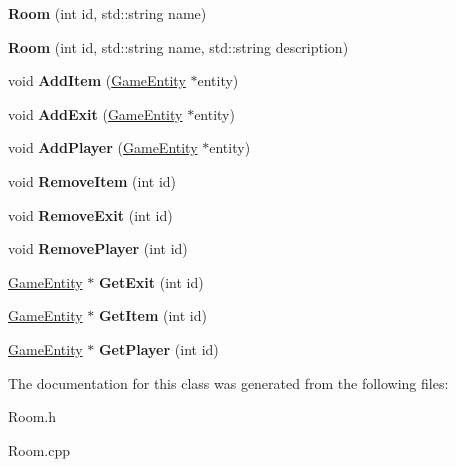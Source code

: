 \begin{DoxyCompactItemize}
\item 
\hypertarget{class_room_a18d9c7ed056c4bec868cf6939dc90aac}{}{\bfseries Room} (int id, std\+::string name)\label{class_room_a18d9c7ed056c4bec868cf6939dc90aac}

\item 
\hypertarget{class_room_a2286569deae9af3cafc5716ce72dcbf1}{}{\bfseries Room} (int id, std\+::string name, std\+::string description)\label{class_room_a2286569deae9af3cafc5716ce72dcbf1}

\item 
\hypertarget{class_room_a174291564fa1e50053230b844c9dc401}{}void {\bfseries Add\+Item} (\hyperlink{class_game_entity}{Game\+Entity} $\ast$entity)\label{class_room_a174291564fa1e50053230b844c9dc401}

\item 
\hypertarget{class_room_a9d3ded2524dc65d34bcdac48ebfbca4f}{}void {\bfseries Add\+Exit} (\hyperlink{class_game_entity}{Game\+Entity} $\ast$entity)\label{class_room_a9d3ded2524dc65d34bcdac48ebfbca4f}

\item 
\hypertarget{class_room_acc80f8dea695a3eee94607fa83531c8c}{}void {\bfseries Add\+Player} (\hyperlink{class_game_entity}{Game\+Entity} $\ast$entity)\label{class_room_acc80f8dea695a3eee94607fa83531c8c}

\item 
\hypertarget{class_room_a2911ca54dcdcde1e2d483d039e01cc62}{}void {\bfseries Remove\+Item} (int id)\label{class_room_a2911ca54dcdcde1e2d483d039e01cc62}

\item 
\hypertarget{class_room_a18fe6c4958fe671bcb417bc8fa5b2f3a}{}void {\bfseries Remove\+Exit} (int id)\label{class_room_a18fe6c4958fe671bcb417bc8fa5b2f3a}

\item 
\hypertarget{class_room_a218c9ab86637b3eadf36e51c71299765}{}void {\bfseries Remove\+Player} (int id)\label{class_room_a218c9ab86637b3eadf36e51c71299765}

\item 
\hypertarget{class_room_af804da54d2d3649637bd0f9f7a3bf989}{}\hyperlink{class_game_entity}{Game\+Entity} $\ast$ {\bfseries Get\+Exit} (int id)\label{class_room_af804da54d2d3649637bd0f9f7a3bf989}

\item 
\hypertarget{class_room_a71f95f978920afe3a2a991d8bcf394f3}{}\hyperlink{class_game_entity}{Game\+Entity} $\ast$ {\bfseries Get\+Item} (int id)\label{class_room_a71f95f978920afe3a2a991d8bcf394f3}

\item 
\hypertarget{class_room_a2a3ab0dc562a3bd4ad61ebea0a8ced08}{}\hyperlink{class_game_entity}{Game\+Entity} $\ast$ {\bfseries Get\+Player} (int id)\label{class_room_a2a3ab0dc562a3bd4ad61ebea0a8ced08}

\end{DoxyCompactItemize}


The documentation for this class was generated from the following files\+:\begin{DoxyCompactItemize}
\item 
Room.\+h\item 
Room.\+cpp\end{DoxyCompactItemize}

